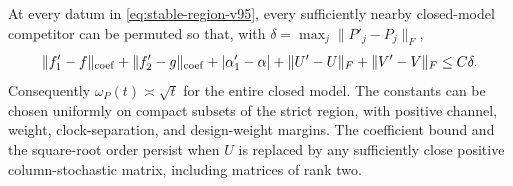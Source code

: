 \begin{theorem}
\label{thm:coefficient-stability-v95}
At every datum in \eqref{eq:stable-region-v95}, every sufficiently
nearby closed-model competitor can be permuted so that, with
$\delta=\max_j\|P'_j-P_j\|_F$,
\begin{equation}\label{eq:full-inverse-v95}
 \|f'_1-f\|_{\rm coef}+\|f'_2-g\|_{\rm coef}
 +|\alpha'_1-\alpha|+\|U'-U\|_F+\|V'-V\|_F\le C\delta.
\end{equation}
Consequently $\omega_{P}(t)\asymp\sqrt t$ for the entire closed model.
The constants can be chosen uniformly on compact subsets of the strict
region, with positive channel, weight, clock-separation, and design-weight
margins. The coefficient bound and the square-root order persist when
$U$ is replaced by any sufficiently close positive column-stochastic
matrix, including matrices of rank two.
\end{theorem}
